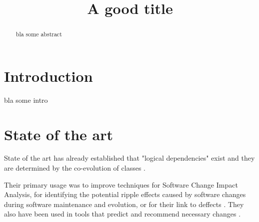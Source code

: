 \documentclass[conference]{IEEEtran}
\begin{document}
%

\title{A good title}


\author{
}






\maketitle

\begin{abstract}

bla some abstract

\end{abstract}




\section{Introduction}
\label{sec:intro}

bla some intro

\section{State of the art}
\label{sec:state}

State of the art has already established that "logical dependencies" exist and they are determined by the co-evolution of classes
\cite{Gall:1998:DLC:850947.853338}.

Their primary usage was to improve techniques for Software Change Impact Analysis, for identifying the potential ripple effects caused by software changes during software maintenance and evolution, or for their link to deffects \cite{wiese}.  They also have been used in tools that predict and recommend necessary changes \cite{Zimmermann:2004:MVH:998675.999460}. 
\end{document}
